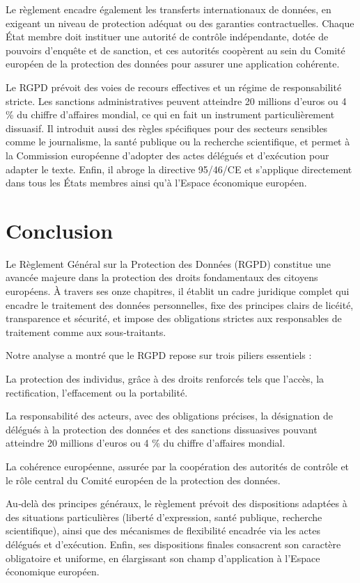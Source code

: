 \documentclass[12pt,a4paper]{article}
\begin{document}
Le règlement encadre également les transferts internationaux de données, en exigeant un niveau de protection adéquat ou des garanties contractuelles. Chaque État membre doit instituer une autorité de contrôle indépendante, dotée de pouvoirs d'enquête et de sanction, et ces autorités coopèrent au sein du Comité européen de la protection des données pour assurer une application cohérente.

Le RGPD prévoit des voies de recours effectives et un régime de responsabilité stricte. Les sanctions administratives peuvent atteindre 20 millions d'euros ou 4 \% du chiffre d'affaires mondial, ce qui en fait un instrument particulièrement dissuasif. Il introduit aussi des règles spécifiques pour des secteurs sensibles comme le journalisme, la santé publique ou la recherche scientifique, et permet à la Commission européenne d'adopter des actes délégués et d'exécution pour adapter le texte. Enfin, il abroge la directive 95/46/CE et s'applique directement dans tous les États membres ainsi qu'à l'Espace économique européen.

\newpage

\section*{Conclusion}

Le Règlement Général sur la Protection des Données (RGPD) constitue une avancée majeure dans la protection des droits fondamentaux des citoyens européens. À travers ses onze chapitres, il établit un cadre juridique complet qui encadre le traitement des données personnelles, fixe des principes clairs de licéité, transparence et sécurité, et impose des obligations strictes aux responsables de traitement comme aux sous‑traitants.

Notre analyse a montré que le RGPD repose sur trois piliers essentiels :

La protection des individus, grâce à des droits renforcés tels que l'accès, la rectification, l'effacement ou la portabilité.

La responsabilité des acteurs, avec des obligations précises, la désignation de délégués à la protection des données et des sanctions dissuasives pouvant atteindre 20 millions d'euros ou 4 \% du chiffre d'affaires mondial.

La cohérence européenne, assurée par la coopération des autorités de contrôle et le rôle central du Comité européen de la protection des données.

Au‑delà des principes généraux, le règlement prévoit des dispositions adaptées à des situations particulières (liberté d'expression, santé publique, recherche scientifique), ainsi que des mécanismes de flexibilité encadrée via les actes délégués et d'exécution. Enfin, ses dispositions finales consacrent son caractère obligatoire et uniforme, en élargissant son champ d'application à l'Espace économique européen.
\end{document}
